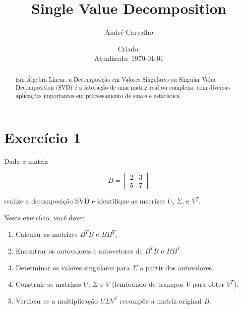 \documentclass[12pt]{article}
\title{\color{lightgreen}Single Value Decomposition}
\author{André Carvalho}
\date{Criado: \dataCriacao\\Atualizado: \shortRomandate\today}
\theoremstyle{definition}
\begin{document}
\maketitle
\thispagestyle{fancy}

\begin{abstract}
Em Álgebra Linear, a Decomposição em Valores Singulares ou Singular Value Decomposition (SVD) é a fatoração de uma matriz real ou complexa, com diversas aplicações importantes em processamento de sinais e estatística.
\end{abstract}

\section{Exercício 1}

Dada a matriz 

\[
B = \begin{bmatrix} 2 & 3 \\ 5 & 7 \end{bmatrix}
\]

\noindent realize a decomposição SVD e identifique as matrizes $U$, $\Sigma$, e $V^T$.

\vspace{5mm}

\noindent Neste exercício, você deve:

\begin{enumerate}
  \item Calcular as matrizes $B^TB$ e $BB^T$.
  \item Encontrar os autovalores e autovetores de $B^TB$ e $BB^T$.
  \item Determinar os valores singulares para $\Sigma$ a partir dos autovalores.
  \item Construir as matrizes $U$, $\Sigma$ e $V$ (lembrando de transpor $V$ para obter $V^T$).
  \item Verificar se a multiplicação $U \Sigma V^T$ recompõe a matriz original $B$.
\end{enumerate}
\end{document}

